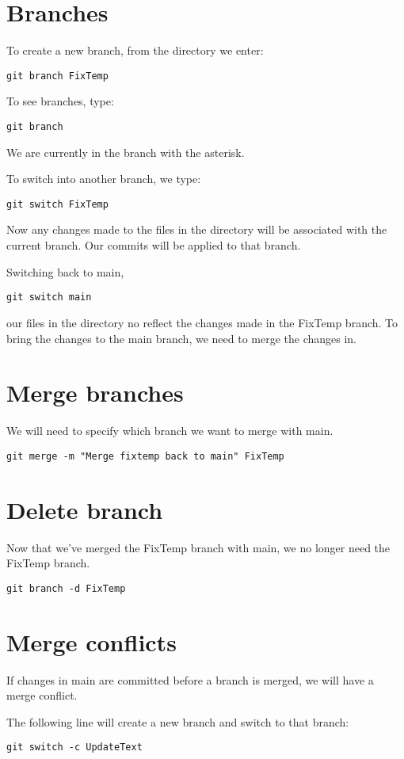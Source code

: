 \documentclass[12pt]{article}
\begin{document}
\section{Branches}
To create a new branch, from the directory we enter:
\begin{Verbatim}
git branch FixTemp
\end{Verbatim}
To see branches, type:
\begin{Verbatim}
git branch
\end{Verbatim}
We are currently in the branch with the asterisk.\par
To switch into another branch, we type:
\begin{Verbatim}
git switch FixTemp
\end{Verbatim}
Now any changes made to the files in the directory will be associated with the current branch. Our commits will be applied to that branch.\par
Switching back to main,
\begin{Verbatim}
git switch main
\end{Verbatim}
our files in the directory no reflect the changes made in the FixTemp branch. To bring the changes to the main branch, we need to merge the changes in.

\section{Merge branches}
We will need to specify which branch we want to merge with main.
\begin{Verbatim}
git merge -m "Merge fixtemp back to main" FixTemp
\end{Verbatim}

\section{Delete branch}
Now that we've merged the FixTemp branch with main, we no longer need the FixTemp branch.
\begin{Verbatim}
git branch -d FixTemp
\end{Verbatim}

\section{Merge conflicts}
If changes in main are committed before a branch is merged, we will have a merge conflict.\par
The following line will create a new branch and switch to that branch:
\begin{Verbatim}
git switch -c UpdateText
\end{Verbatim}
\end{document}
